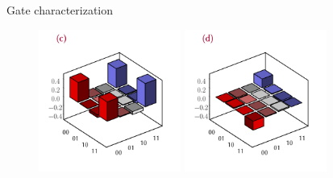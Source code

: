 \documentclass[final]{beamer}
\newlength{\colwidth}
\begin{document}
\begin{frame}[t]
\begin{columns}[t]
\begin{column}{\colwidth}
\begin{block}{Gate characterization}
\begin{figure}[htpb]
\begin{minipage}{11pc}
                        \end{minipage}%
                        \begin{minipage}{11pc}
                            \includegraphics[width=11pc]{mat3d_rel_toff_real.png}
                        \end{minipage}%
                        \begin{minipage}{11pc}
                           \includegraphics[width=11pc]{mat3d_rel_toff_imaginary.png}

\end{minipage}
\end{figure}
\end{block}
\end{column}
\end{columns}
\end{frame}
\end{document}
